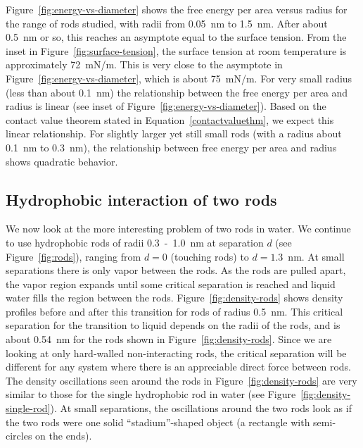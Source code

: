 \documentclass[letterpaper,twocolumn,amsmath,amssymb,prb]{revtex4-1}
\begin{document}
Figure~\ref{fig:energy-vs-diameter} shows the free energy per area versus
radius for the range of rods studied, with radii from 0.05~nm to 1.5~nm. After 
about 0.5~nm or so, this reaches
an asymptote equal to the surface tension. From the inset in 
Figure~\ref{fig:surface-tension}, the surface tension at room 
temperature is approximately 72~mN/m. This is very close to the 
asymptote in Figure~\ref{fig:energy-vs-diameter}, which is about 75~mN/m. 
For very small radius (less than about 0.1~nm) the
relationship between the free energy per area and radius is linear (see inset
of Figure~\ref{fig:energy-vs-diameter}). Based on the contact value theorem
stated in Equation~\ref{contactvaluethm}, we expect this linear relationship.
For slightly larger yet still small rods (with a radius about 0.1~nm to 
0.3~nm), the relationship between free energy per area and radius shows
quadratic behavior.

\subsection{Hydrophobic interaction of two rods}

We now look at the more interesting problem of two rods in water. We continue to
use hydrophobic rods of radii 0.3~-~1.0~nm at separation $d$ 
(see Figure~\ref{fig:rods}), ranging from $d=0$ 
(touching rods) to $d=1.3$~nm. At small
separations there is only vapor between the rods. As the rods are
pulled apart, the vapor region expands until some critical separation is
reached and liquid water fills the region between the rods. 
Figure~\ref{fig:density-rods} 
shows density profiles before and after this transition
for rods of radius 0.5~nm. This critical separation for the transition to liquid depends
on the radii of the rods, and is about 0.54~nm for the rods shown in 
Figure~\ref{fig:density-rods}. 
Since we are looking at only hard-walled
non-interacting rods, the critical separation will be
different for any system where there is an appreciable direct force between rods. 
The density oscillations seen around the rods in Figure~\ref{fig:density-rods} 
are very similar to
those for the single hydrophobic rod in water (see Figure~\ref{fig:density-single-rod}).
At small separations, the oscillations around the two rods look as if the two rods were one
solid ``stadium''-shaped object (a rectangle with semi-circles on the ends).
\end{document}
